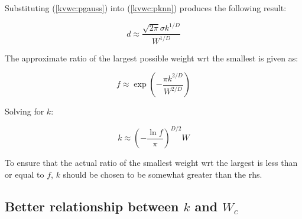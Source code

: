 \documentclass[12pt]{report}
\begin{document}
\begin{flushleft}
Substituting (\ref{kvwc:pgauss}) into (\ref{kvwc:pknn}) produces the following result:

\begin{equation}
d \approx \frac{\sqrt{2\pi} \sigma k^{1/D}}{W^{1/D}}
\end{equation}

The approximate ratio of the largest possible weight wrt the smallest
is given as:

\begin{equation}
f \approx \exp \left (- \frac{\pi k^{2/D}}{W^{2/D}} \right )
\end{equation}

Solving for $k$:

\begin{equation}
k \approx \left (- \frac{\ln f}{\pi} \right )^{D/2} W
\end{equation}

To ensure that the actual ratio of the smallest weight wrt the largest is less than
or equal to $f$, $k$ should be chosen to be somewhat greater than the rhs.
		
\subsection{Better relationship between $k$ and $W_c$}


\end{flushleft}
\end{document}
